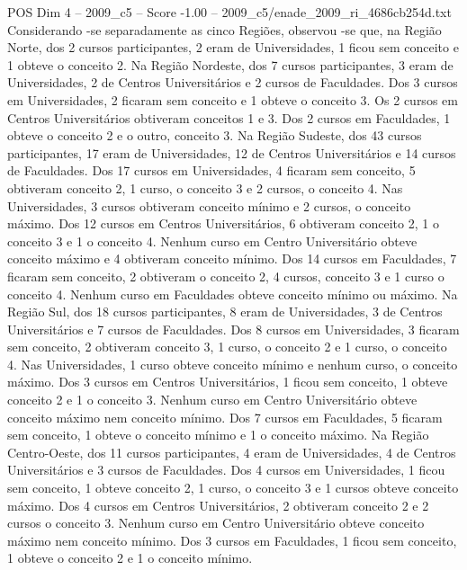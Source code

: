 \begin{textsample}{POS Dim 4 – 2009\_c5 – Score -1.00 – 2009\_c5/enade\_2009\_ri\_4686cb254d.txt}
Considerando -se separadamente as cinco Regiões, observou -se que, na Região Norte, dos 2 cursos participantes, 2 eram de Universidades, 1 ficou sem conceito e 1 obteve o conceito 2.
Na Região Nordeste, dos 7 cursos participantes, 3 eram de Universidades, 2 de Centros Universitários e 2 cursos de Faculdades.
Dos 3 cursos em Universidades, 2 ficaram sem conceito e 1 obteve o conceito 3.
Os 2 cursos em Centros Universitários obtiveram conceitos 1 e 3.
Dos 2 cursos em Faculdades, 1 obteve o conceito 2 e o outro, conceito 3.
Na Região Sudeste, dos 43 cursos participantes, 17 eram de Universidades, 12 de Centros Universitários e 14 cursos de Faculdades.
Dos 17 cursos em Universidades, 4 ficaram sem conceito, 5 obtiveram conceito 2, 1 curso, o conceito 3 e 2 cursos, o conceito 4.
Nas Universidades, 3 cursos obtiveram conceito mínimo e 2 cursos, o conceito máximo.
Dos 12 cursos em Centros Universitários, 6 obtiveram conceito 2, 1 o conceito 3 e 1 o conceito 4.
Nenhum curso em Centro Universitário obteve conceito máximo e 4 obtiveram conceito mínimo.
Dos 14 cursos em Faculdades, 7 ficaram sem conceito, 2 obtiveram o conceito 2, 4 cursos, conceito 3 e 1 curso o conceito 4.
Nenhum curso em Faculdades obteve conceito mínimo ou máximo.
Na Região Sul, dos 18 cursos participantes, 8 eram de Universidades, 3 de Centros Universitários e 7 cursos de Faculdades.
Dos 8 cursos em Universidades, 3 ficaram sem conceito, 2 obtiveram conceito 3, 1 curso, o conceito 2 e 1 curso, o conceito 4.
Nas Universidades, 1 curso obteve conceito mínimo e nenhum curso, o conceito máximo.
Dos 3 cursos em Centros Universitários, 1 ficou sem conceito, 1 obteve conceito 2 e 1 o conceito 3.
Nenhum curso em Centro Universitário obteve conceito máximo nem conceito mínimo.
Dos 7 cursos em Faculdades, 5 ficaram sem conceito, 1 obteve o conceito mínimo e 1 o conceito máximo.
Na Região Centro-Oeste, dos 11 cursos participantes, 4 eram de Universidades, 4 de Centros Universitários e 3 cursos de Faculdades.
Dos 4 cursos em Universidades, 1 ficou sem conceito, 1 obteve conceito 2, 1 curso, o conceito 3 e 1 cursos obteve conceito máximo.
Dos 4 cursos em Centros Universitários, 2 obtiveram conceito 2 e 2 cursos o conceito 3.
Nenhum curso em Centro Universitário obteve conceito máximo nem conceito mínimo.
Dos 3 cursos em Faculdades, 1 ficou sem conceito, 1 obteve o conceito 2 e 1 o conceito mínimo.

\end{textsample}
